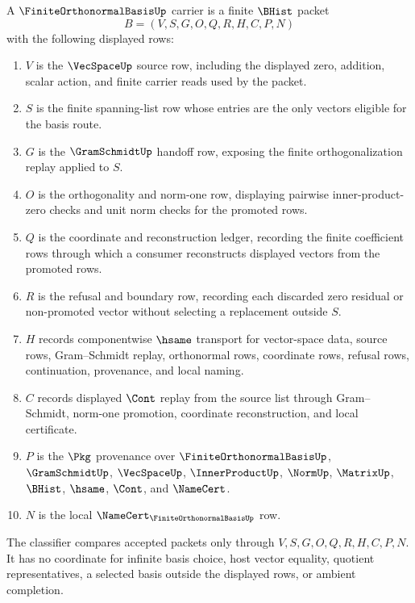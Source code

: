 \begin{definition}
\label{def:finite-orthonormal-basis-carrier}
A $\FiniteOrthonormalBasisUp$ carrier is a finite $\BHist$ packet
$$
B=(V,S,G,O,Q,R,H,C,P,N)
$$
with the following displayed rows:
\begin{enumerate}
\item $V$ is the $\VecSpaceUp$ source row, including the displayed zero, addition, scalar action, and finite carrier reads used by the packet.
\item $S$ is the finite spanning-list row whose entries are the only vectors eligible for the basis route.
\item $G$ is the $\GramSchmidtUp$ handoff row, exposing the finite orthogonalization replay applied to $S$.
\item $O$ is the orthogonality and norm-one row, displaying pairwise inner-product-zero checks and unit norm checks for the promoted rows.
\item $Q$ is the coordinate and reconstruction ledger, recording the finite coefficient rows through which a consumer reconstructs displayed vectors from the promoted rows.
\item $R$ is the refusal and boundary row, recording each discarded zero residual or non-promoted vector without selecting a replacement outside $S$.
\item $H$ records componentwise $\hsame$ transport for vector-space data, source rows, Gram--Schmidt replay, orthonormal rows, coordinate rows, refusal rows, continuation, provenance, and local naming.
\item $C$ records displayed $\Cont$ replay from the source list through Gram--Schmidt, norm-one promotion, coordinate reconstruction, and local certificate.
\item $P$ is the $\Pkg$ provenance over $\FiniteOrthonormalBasisUp$, $\GramSchmidtUp$, $\VecSpaceUp$, $\InnerProductUp$, $\NormUp$, $\MatrixUp$, $\BHist$, $\hsame$, $\Cont$, and $\NameCert$.
\item $N$ is the local $\NameCert_{\FiniteOrthonormalBasisUp}$ row.
\end{enumerate}
The classifier compares accepted packets only through $V,S,G,O,Q,R,H,C,P,N$. It has no coordinate for infinite basis choice, host vector equality, quotient representatives, a selected basis outside the displayed rows, or ambient completion.
\end{definition}

